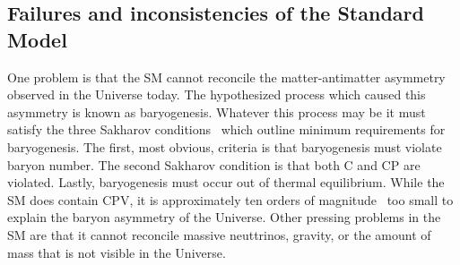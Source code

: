 \subsection{Failures and inconsistencies of the Standard Model}
\label{sec:bsm:fail}
One problem is that the SM cannot reconcile the matter-antimatter asymmetry observed in the
Universe today.
The hypothesized process which caused this asymmetry is known as baryogenesis.
Whatever this process may be it must satisfy the three Sakharov
conditions~\cite{1991SvPhU..34..392S} which outline minimum requirements for baryogenesis.
The first, most obvious, criteria is that baryogenesis must violate baryon number.
The second Sakharov condition is that both C and CP are violated.
Lastly, baryogenesis must occur out of thermal equilibrium.
While the SM does contain CPV, it is approximately ten orders of
magnitude~\cite{Cline:2006ts,Huet:1994jb} too small to explain the baryon asymmetry of the
Universe.
Other pressing problems in the SM are that it cannot reconcile massive neuttrinos, gravity, or the
amount of mass that is not visible in the Universe.


